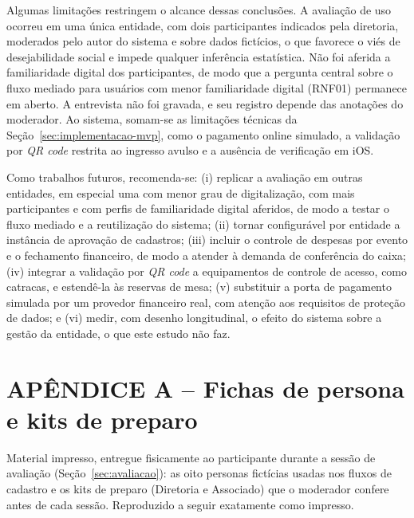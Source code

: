 \documentclass[12pt,a4paper]{article}
\begin{document}
Algumas limitações restringem o alcance dessas conclusões. A avaliação de uso ocorreu em uma única
entidade, com dois participantes indicados pela diretoria, moderados pelo autor do sistema e sobre
dados fictícios, o que favorece o viés de desejabilidade social e impede qualquer inferência
estatística. Não foi aferida a familiaridade digital dos participantes, de modo que a pergunta central
sobre o fluxo mediado para usuários com menor familiaridade digital (RNF01) permanece em aberto. A
entrevista não foi gravada, e seu registro depende das anotações do moderador. Ao sistema, somam-se
as limitações técnicas da Seção~\ref{sec:implementacao-mvp}, como o pagamento online simulado, a
validação por \textit{QR code} restrita ao ingresso avulso e a ausência de verificação em iOS.

Como trabalhos futuros, recomenda-se: (i) replicar a avaliação em outras entidades, em especial uma
com menor grau de digitalização, com mais participantes e com perfis de familiaridade digital
aferidos, de modo a testar o fluxo mediado e a reutilização do sistema; (ii) tornar configurável por
entidade a instância de aprovação de cadastros; (iii) incluir o controle de despesas por evento e o
fechamento financeiro, de modo a atender à demanda de conferência do caixa; (iv) integrar a validação
por \textit{QR code} a equipamentos de controle de acesso, como catracas, e estendê-la às reservas de
mesa; (v) substituir a porta de pagamento simulada por um provedor financeiro real, com atenção aos
requisitos de proteção de dados; e (vi) medir, com desenho longitudinal, o efeito do sistema sobre a
gestão da entidade, o que este estudo não faz.

\printbibliography[title={REFERÊNCIAS}]

\clearpage
\section*{APÊNDICE A -- Fichas de persona e kits de preparo}
\makeatletter
\renewcommand{\@currentlabel}{A}
\makeatother
\label{apx:fichas}

Material impresso, entregue fisicamente ao participante durante a sessão de avaliação
(Seção~\ref{sec:avaliacao}): as oito personas fictícias usadas nos fluxos de cadastro e os kits de
preparo (Diretoria e Associado) que o moderador confere antes de cada sessão. Reproduzido a seguir
exatamente como impresso.
\end{document}

